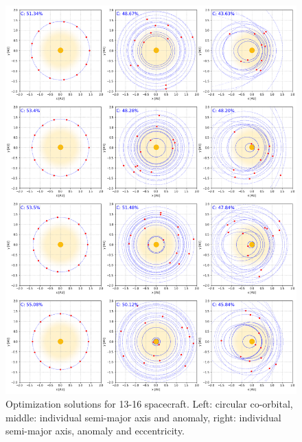 \begin{figure}[p]
 \centering
 \includegraphics[width=1.0\textwidth]{img/appendix_orbit_4.png}
 \caption{Optimization solutions for 13-16 spacecraft. Left: circular co-orbital, middle: individual semi-major axis and anomaly, right: individual semi-major axis, anomaly and eccentricity.}
\end{figure}

